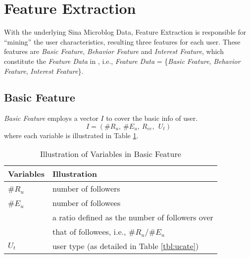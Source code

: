 

\section{Feature Extraction}
\label{sec:fe}

With the underlying Sina Microblog Data, Feature Extraction is responsible for ``mining'' the user characteristics, resulting three features for each user.
These features are \textit{Basic Feature}, \textit{Behavior Feature} and \textit{Interest Feature}, which constitute the \textit{Feature Data} in \sys{}, i.e., \textit{Feature Data} = \{\textit{Basic Feature}, \textit{Behavior Feature}, \textit{Interest Feature}\}.

\subsection{Basic Feature}

\textit{Basic Feature} employs a vector $I$ to cover the basic info of user.
\begin{equation}
\label{eq:info}
	I = (\#R_u,\ \#E_u,\ R_{ee},\ \ U_t)
\end{equation}
where each variable is illustrated in Table \ref{tbl:fe-info}.

\begin{table}[tb!]
\centering
\begin{small}
\caption{Illustration of Variables in Basic Feature}
\vspace{0.3cm}
\label{tbl:fe-info}
\begin{tabular}{ll}
\toprule
\multicolumn{1}{l}{\textbf{Variables}} & \multicolumn{1}{l}{\textbf{Illustration}}	\\	\midrule \midrule
\#$R_u$				& number of followers				\\	\midrule
\#$E_u$				& number of followees				\\	\midrule
                    & a ratio defined as the number of followers over \\  
\raisebox{1.5ex}{$R_{ee}$}  & that of followees, i.e., ${\#R_u}/{\#E_u}$ \\  \midrule
$U_t$					& user type (as detailed in Table \ref{tbl:ucate})			\\ \bottomrule
\end{tabular}
\end{small}
\end{table}


